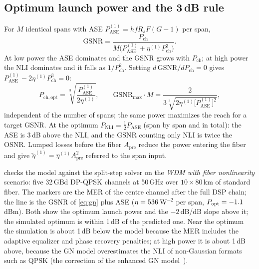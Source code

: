 \subsection{Optimum launch power and the 3\,dB rule}
For $M$ identical spans with ASE $P^{(1)}_{\mathrm{ASE}}=hfR_sF(G-1)$ per span,
\begin{equation}
  \mathrm{GSNR}=\frac{P_{\mathrm{ch}}}{M\big(P^{(1)}_{\mathrm{ASE}}+\eta^{(1)}P_{\mathrm{ch}}^3\big)} .
\end{equation}
At low power the ASE dominates and the GSNR grows with $P_{\mathrm{ch}}$; at high power the NLI dominates and it
falls as $1/P_{\mathrm{ch}}^2$. Setting $d\,\mathrm{GSNR}/dP_{\mathrm{ch}}=0$ gives $P^{(1)}_{\mathrm{ASE}}-2\eta^{(1)}P^3_{\mathrm{ch}}=0$:
\begin{equation}
  P_{\mathrm{ch,opt}}=\sqrt[3]{\frac{P^{(1)}_{\mathrm{ASE}}}{2\eta^{(1)}}},\qquad
  \mathrm{GSNR}_{\max}\cdot M=\frac{2}{3\sqrt[3]{2\eta^{(1)}\big[P^{(1)}_{\mathrm{ASE}}\big]^2}} ,
\end{equation}
independent of the number of spans; the same power maximizes the reach for a target GSNR. At the
optimum $P_{\mathrm{NLI}}=\frac12P_{\mathrm{ASE}}$ (span by span and in total): the ASE is 3\,dB above the NLI, and the GSNR
counting only NLI is twice the OSNR. Lumped losses before the fiber $A_{\mathrm{pre}}$ reduce the power
entering the fiber and give $\tilde\eta^{(1)}=\eta^{(1)}A_{\mathrm{pre}}^2$ referred to the span input.

 checks the model against the split-step solver on the \emph{WDM with fiber
nonlinearity} scenario: five 32\,GBd DP-QPSK channels at 50\,GHz over $10\times80$\,km of standard fiber. The
markers are the MER of the centre channel after the full DSP chain; the line is the GSNR of
\cref{eq:gn} plus ASE ($\eta=536$\,W$^{-2}$ per span, $P_{\mathrm{opt}}=-1.1$\,dBm). Both show the optimum launch
power and the $-2$\,dB/dB slope above it; the simulated optimum is within 1\,dB of the predicted one. Near
the optimum the simulation is about 1\,dB below the model because the MER includes the adaptive
equalizer and phase recovery penalties; at high power it is about 1\,dB above, because the GN model
overestimates the NLI of non-Gaussian formats such as QPSK (the correction of the enhanced GN
model~\cite{carena2014}).


